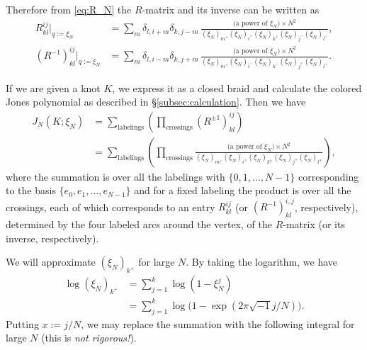 \documentclass{amsart}
\theoremstyle{definition}
\theoremstyle{remark}
\numberwithin{equation}{section}
\begin{document}
\par
Therefore from \eqref{eq:R_N} the $R$-matrix and its inverse can be written as
\begin{align*}
  R^{ij}_{kl}\bigr|_{q:=\xi_N}
  &=
  \sum_{m}
  \delta_{l,i+m}\delta_{k,j-m}\,
  \frac{\text{(a power of $\xi_N$)}\times N^2}
       {(\xi_N)_{m^+}(\xi_N)_{i^+}(\xi_N)_{k^+}
                       (\xi_N)_{j^-}(\xi_N)_{l^-}},
  \\
  (R^{-1})^{ij}_{kl}\bigr|_{q:=\xi_N}
  &=
  \sum_{m}
  \delta_{l,i-m}\delta_{k,j+m}\,
  \frac{\text{(a power of $\xi_N$)}\times N^{2}}
       {(\xi_N)_{m^+}(\xi_N)_{i^-}(\xi_N)_{k^-}
                       (\xi_N)_{j^+}(\xi_N)_{l^+}}.
\end{align*}
\par
If we are given a knot $K$, we express it as a closed braid and calculate the colored Jones polynomial as described in \S\ref{subsec:calculation}.
Then we have
\begin{equation}\label{eq:Jones_R}
\begin{split}
  J_N(K;\xi_N)
  &=
  \sum_{\text{labelings}}
  \left(
    \prod_{\text{crossings}}
    (R^{\pm1})^{ij}_{kl}
  \right)
  \\
  &=
  \sum_{\text{labelings}}
  \left(
    \prod_{\text{crossings}}
    \frac{\text{(a power of $\xi_N$)}\times N^{2}}
         {(\xi_N)_{m^+}(\xi_N)_{i^{\pm}}(\xi_N)_{k^{\pm}}
                         (\xi_N)_{j^{\mp}}(\xi_N)_{l^{\mp}}}
  \right),
\end{split}
\end{equation}
where the summation is over all the labelings with $\{0,1,\dots,N-1\}$ corresponding to the basis $\{e_0,e_1,\dots,e_{N-1}\}$ and for a fixed labeling the product is over all the crossings, each of which corresponds to an entry $R^{ij}_{kl}$ (or $(R^{-1})^{i,j}_{kl}$, respectively), determined by the four labeled arcs around the vertex, of the $R$-matrix (or its inverse, respectively).
\par
We will approximate $(\xi_N)_{k^{+}}$ for large $N$.
By taking the logarithm, we have
\begin{equation*}
\begin{split}
  \log(\xi_N)_{k^{+}}
  &=
  \sum_{j=1}^{k}
  \log(1-\xi^j_N)
  \\
  &=
  \sum_{j=1}^{k}
  \log\bigl(1-\exp(2\pi\sqrt{-1}j/N)\bigr).
\end{split}
\end{equation*}
Putting $x:=j/N$, we may replace the summation with the following integral for large $N$ (this is {\em not rigorous!}).
\end{document}
